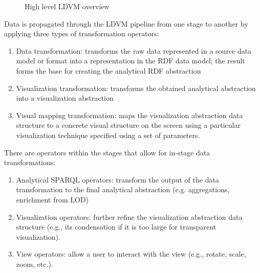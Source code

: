 \documentclass[a4paper,12pt,oneside]{report}
\begin{document}
{{{{\begin{figure}[h!]
\caption{High level LDVM overview}
\end{figure}
}
Data is propagated through the LDVM pipeline from one stage to another by applying three types of transformation operators:
\begin{enumerate}
\item{Data transformation: transforms the raw data represented in a source data model or format into a representation in the RDF data model; the result forms the base for creating the analytical RDF abstraction}
\item{Visualization transformation: transforms the obtained analytical abstraction into a visualization abstraction}
\item{Visual mapping transformation: maps the visualization abstraction data structure to a concrete visual structure on the screen using a particular visualization technique specified using a set of parameters. }
\end{enumerate}
There are operators within the stages that allow for in-stage data transformations:
\begin{enumerate}
\item{Analytical SPARQL operators: transform the output of the data transformation to the final analytical abstraction (e.g. aggregations, enrichment from LOD)}
\item{Visualization operators: further refine the visualization abstraction data structure (e.g., its condensation if it is too large for transparent visualization).}
\item{View operators: allow a user to interact with the view (e.g., rotate, scale, zoom, etc.). }
\end{enumerate}
}
}}
\end{document}
